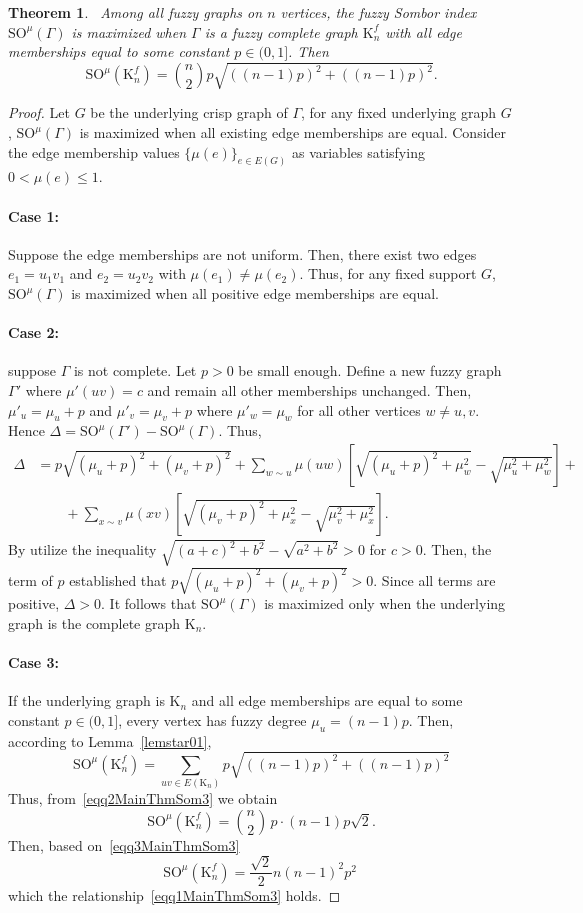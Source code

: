 \documentclass[10pt,a4paper]{amsart}
\newtheorem{theorem}{Theorem}
\newcommand{\KK}{\mathrm{K}}
\newcommand{\SOG}{\mathrm{SO}^{\mu}}
\newcommand{\case}[1]{\paragraph*{Case #1:}}
\begin{document}
\begin{theorem}~\label{MainThmSom3}
Among all fuzzy graphs on $n$ vertices, the fuzzy Sombor index $\SOG(\Gamma)$ is maximized when $\Gamma$ is a fuzzy complete graph $\KK_n^f$ with all edge memberships equal to some constant $p \in (0,1]$. Then
\begin{equation}~\label{eqq1MainThmSom3}
\SOG(\KK_n^f)=\binom{n}{2} p \sqrt{( (n-1)p)^2 + ((n-1)p)^2 }.
\end{equation}
\end{theorem}

\begin{proof}
Let $G$ be the underlying crisp graph of $\Gamma$, for any fixed underlying graph $G$, $\SOG(\Gamma)$ is maximized when all existing edge memberships are equal.
Consider the edge membership values $\{\mu(e)\}_{e \in E(G)}$ as variables satisfying $0 < \mu(e) \leqslant 1$.
\case{1} Suppose the edge memberships are not uniform. Then, there exist two edges $e_1=u_1v_1$ and $e_2=u_2v_2$ with $\mu(e_1) \neq \mu(e_2)$.  
Thus, for any fixed support $G$, $\SOG(\Gamma)$ is maximized when all positive edge memberships are equal.

\case{2} suppose $\Gamma$ is not complete.
Let $p> 0$ be small enough. Define a new fuzzy graph $\Gamma'$ where $\mu'(uv) = c$ and remain all other memberships unchanged. Then, $\mu'_u=\mu_u+p$ and $\mu'_v=\mu_v+p$ where  $\mu'_w=\mu_w$ for all other vertices $w \neq u,v$. Hence $\Delta = \SOG(\Gamma') - \SOG(\Gamma)$. Thus, 
\[
\begin{aligned}
\Delta&=p \sqrt{(\mu_u+p)^2+(\mu_v+p)^2} 
+\sum_{w \sim u} \mu(uw) \left[ \sqrt{(\mu_u+p)^2+\mu_w^2}-\sqrt{\mu_u^2+\mu_w^2} \right]+\\
&\qquad+\sum_{x \sim v} \mu(xv) \left[ \sqrt{(\mu_v+p)^2+\mu_x^2}-\sqrt{\mu_v^2+\mu_x^2} \right].
\end{aligned}
\]
By utilize the inequality $\sqrt{(a + c)^2 + b^2} - \sqrt{a^2 + b^2} > 0$ for $c > 0$. Then, the term of $p$ established that $p \sqrt{(\mu_u+p)^2+(\mu_v+p)^2}>0$. Since all terms are positive, $\Delta > 0$. It follows that $\SOG(\Gamma)$ is maximized only when the underlying graph is the complete graph $\KK_n$.

\case{3} If the underlying graph is $\KK_n$ and all edge memberships are equal to some constant $p \in (0,1]$, every vertex has fuzzy degree $\mu_u=(n-1)p$. Then, according to Lemma~\ref{lemstar01}, 
\begin{equation}~\label{eqq2MainThmSom3}
\SOG(\KK_n^f) = \sum_{uv \in E(\KK_n)} p \sqrt{((n-1)p)^2+((n-1)p)^2}
\end{equation}
Thus, from~\eqref{eqq2MainThmSom3} we obtain 
\begin{equation}~\label{eqq3MainThmSom3}
\SOG(\KK_n^f)=\binom{n}{2} \, p \cdot (n-1)p\sqrt{2}.
\end{equation}
Then, based on~\eqref{eqq3MainThmSom3}
\[
\SOG(\KK_n^f)=\frac{\sqrt{2}}{2} n (n-1)^2 p^2
\]
which the relationship~\eqref{eqq1MainThmSom3} holds.
\end{proof}
\end{document}
